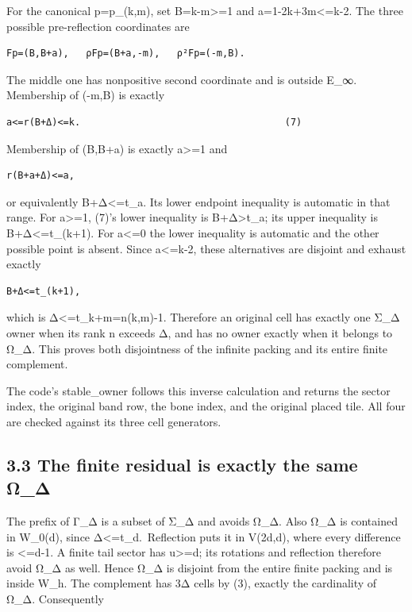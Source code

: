 \documentclass[
  10pt,
]{scrreprt}
\begin{document}
For the canonical p=p\_(k,m), set B=k-m\textgreater=1 and
a=1-2k+3m\textless=k-2. The three possible pre-reflection coordinates
are

\begin{verbatim}
Fp=(B,B+a),   ρFp=(B+a,-m),   ρ²Fp=(-m,B).
\end{verbatim}

The middle one has nonpositive second coordinate and is outside E\_∞.
Membership of (-m,B) is exactly

\begin{verbatim}
a<=r(B+Δ)<=k.                                    (7)
\end{verbatim}

Membership of (B,B+a) is exactly a\textgreater=1 and

\begin{verbatim}
r(B+a+Δ)<=a,
\end{verbatim}

or equivalently B+Δ\textless=t\_a. Its lower endpoint inequality is
automatic in that range. For a\textgreater=1, (7)'s lower inequality is
B+Δ\textgreater t\_a; its upper inequality is B+Δ\textless=t\_(k+1). For
a\textless=0 the lower inequality is automatic and the other possible
point is absent. Since a\textless=k-2, these alternatives are disjoint
and exhaust exactly

\begin{verbatim}
B+Δ<=t_(k+1),
\end{verbatim}

which is Δ\textless=t\_k+m=n(k,m)-1. Therefore an original cell has
exactly one Σ\_Δ owner when its rank n exceeds Δ, and has no owner
exactly when it belongs to Ω\_Δ. This proves both disjointness of the
infinite packing and its entire finite complement.

The code's stable\_owner follows this inverse calculation and returns
the sector index, the original band row, the bone index, and the
original placed tile. All four are checked against its three cell
generators.

\subsection{3.3 The finite residual is exactly the same
Ω\_Δ}\label{edition-10-section-9}

The prefix of Γ\_Δ is a subset of Σ\_Δ and avoids Ω\_Δ. Also Ω\_Δ is
contained in W\_0(d), since Δ\textless=t\_d.~Reflection puts it in
V(2d,d), where every difference is \textless=d-1. A finite tail sector
has u\textgreater=d; its rotations and reflection therefore avoid Ω\_Δ
as well. Hence Ω\_Δ is disjoint from the entire finite packing and is
inside W\_h. The complement has 3Δ cells by (3), exactly the cardinality
of Ω\_Δ. Consequently
\end{document}
